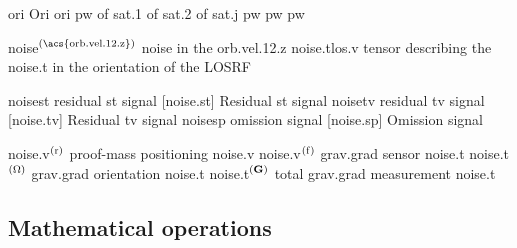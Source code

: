 \begin{acronym}[---------------]
						{ori}
						{Ori}
					{ori}
			{pw}
			{ of }			{sat.1}
			{ of }			{sat.2}
			{ of }			{sat.j}
	{pw}
	{pw}
	{pw}

							{\acs{noise}$^{\left(\mbox{\scriptsize{\acs{orb.vel.12.z}}}\right)}$}	{\acl{noise} in the \acl{orb.vel.12.z}}
							{\acs{noise.t}\acs{los.v}}	{tensor describing the \acl{noise.t} in the orientation of the \acs{LOSRF}}

				{\acs{noise}\acs{st}}		{residual \acl{st} signal}
				[\acs{noise.st}]				{Residual \acl{st} signal}
				{\acs{noise}\acs{tv}}		{residual \acl{tv} signal}
				[\acs{noise.tv}]				{Residual \acl{tv} signal}
				{\acs{noise}\acs{sp}}		{omission signal}
				[\acs{noise.sp}]				{Omission signal}

			{\acs{noise.v}$^{\rm\left(r\right)}$}
																												{proof-mass positioning \acl{noise.v}}
			{\acs{noise.v}$^{\rm\left(f\right)}$}
																												{\acl{grav.grad} sensor \acl{noise.t}}
			{\acs{noise.t}$^{\rm\left({\bm{\Omega}}\right)}$}
																												{\acl{grav.grad} orientation \acl{noise.t}}
			{\acs{noise.t}$^{\rm\left({\bf G}\right)}$}
																												{total \acl{grav.grad} measurement \acl{noise.t}}



\ifdefined\IncludeSymbolsText
\begin{changemargin}{\symbolsleftmarginfix}{\symbolsrightmarginfix}
\ifdefined\IncludeSymbolsSections
\section{Mathematical operations}
\label{sec:acro_math}
\else
{}\medskip
\fi
\end{changemargin}
\fi


\end{acronym}
